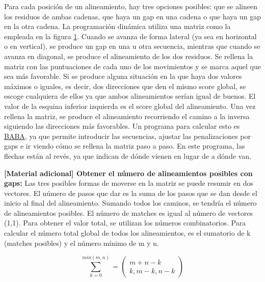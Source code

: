 \begin{figure}[htbp]
\label{fig:dynamic-programming}
\end{figure}

\normalsize
Para cada posición de un alineamiento, hay tres opciones posibles: que se alineen los residuos de ambas cadenas, que haya un gap en una cadena o que haya un gap en la otra cadena. La programación dinámica utiliza una matriz como la empleada en la figura \ref{fig:dynamic-programming}. Cuando se avanza de forma lateral (ya sea en horizontal o en vertical), se produce un gap en una u otra secuencia, mientras que cuando se avanza en diagonal, se produce el alineamiento de los dos residuos. Se rellena la matriz con las puntuaciones de cada uno de los movimientos y se marca aquel que sea más favorable. Si se produce alguna situación en la que haya dos valores máximos o iguales, es decir, dos direcciones que den el mismo score global, se escoge cualquiera de ellos ya que ambos alineamientos serían igual de buenos. El valor de la esquina inferior izquierda es el score global del alineamiento. Una vez rellena la matriz, se produce el alineamiento recorriendo el camino a la inversa siguiendo las direcciones más favorables. Un programa para calcular esto es \href{https://baba.sourceforge.net/}{BABA}, ya que permite introducir las secuencias, ajustar las penalizaciones por gaps e ir viendo cómo se rellena la matriz paso a paso. En este programa, las flechas están al revés, ya que indican de dónde vienen en lugar de a dónde van.

\begin{table}[htbp]
\begin{mdframed}[backgroundcolor=black!10]
\textbf{[Material adicional] Obtener el número de alineamientos posibles con gaps:} Las tres posibles formas de moverse en la matriz se puede resumir en dos vectores. El número de pasos que dar es la suma de los pasos que se dan desde el inicio al final del alineamiento. Sumando todos los caminos, se tendría el número de alineamientos posibles. El número de matches es igual al número de vectores (1,1). Para obtener el valor total, se utilizan los números combinatorios. Para calcular el número total global de todos los alineamientos, es el sumatorio de k (matches posibles) y el número mínimo de m y n.

$$\sum_{k=0}^{min(m,n)} = \begin{pmatrix}
          m + n - k \\
          k, m-k, n-k
    \end{pmatrix}$$
\end{mdframed}
\end{table}

